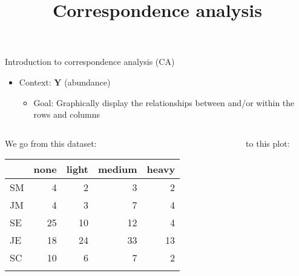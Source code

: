 \documentclass[
  ignorenonframetext,
  aspectratio=169]{beamer}
\title{Correspondence analysis}
\author{}
\date{}
\providecommand{\tightlist}{%
  \setlength{\itemsep}{0pt}\setlength{\parskip}{0pt}}\usepackage{longtable,booktabs,array}
\begin{document}
\frame{\titlepage}
\ifdefined\Shaded\renewenvironment{Shaded}{\begin{tcolorbox}[breakable, borderline west={3pt}{0pt}{shadecolor}, frame hidden, interior hidden, enhanced, sharp corners, boxrule=0pt]}{\end{tcolorbox}}\fi

\begin{frame}{Introduction to correspondence analysis (CA)}
\protect\hypertarget{introduction-to-correspondence-analysis-ca}{}
\vspace{0.5cm}

\begin{itemize}
\tightlist
\item
  Context: \(\symbf{Y}\) (abundance)

  \begin{itemize}
  \tightlist
  \item
    Goal: Graphically display the relationships between and/or within
    the rows and columns
  \end{itemize}
\end{itemize}

\begin{columns}[T]
\begin{column}{0.45\textwidth}
\begin{center} 

We go from this dataset:

\end{center}

\vspace{0.4cm}

\begin{longtable}[]{@{}lrrrr@{}}
\toprule\noalign{}
& none & light & medium & heavy \\
\midrule\noalign{}
\endhead
SM & 4 & 2 & 3 & 2 \\
JM & 4 & 3 & 7 & 4 \\
SE & 25 & 10 & 12 & 4 \\
JE & 18 & 24 & 33 & 13 \\
SC & 10 & 6 & 7 & 2 \\
\bottomrule\noalign{}
\end{longtable}
\end{column}

\begin{column}{0.025\textwidth}
\end{column}

\begin{column}{0.525\textwidth}
\begin{center}
to this plot:
\end{center}


\end{column}
\end{columns}
\end{frame}
\end{document}
